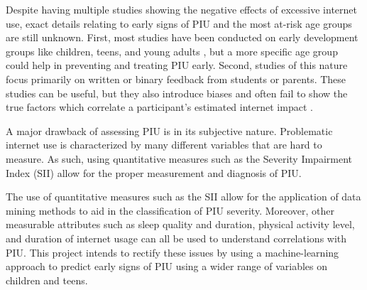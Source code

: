 \documentclass[11pt]{extarticle}
\begin{document}

Despite having multiple studies showing the negative effects of excessive internet use, exact details relating to early signs of PIU and the most at-risk age groups are still unknown.
First, most studies have been conducted on early development groups like children, teens, and young adults \cite{Pettorruso2020-qt,Cash2012-rb,Aboujaoude2010-mc,Restrepo2020-pb}, but a more specific age group could help in preventing and treating PIU early.
Second, studies of this nature focus primarily on written or binary feedback from students or parents. 
These studies can be useful, but they also introduce biases and often fail to show the true factors which correlate a participant's estimated internet impact \cite{Restrepo2020-pb,Aboujaoude2010-mc}.

A major drawback of assessing PIU is in its subjective nature. Problematic internet use is characterized by many different variables that are hard to measure. As such, using quantitative measures such as the Severity Impairment Index (SII) allow for the proper measurement and diagnosis of PIU.

The use of quantitative measures such as the SII allow for the application of data mining methods to aid in the classification of PIU severity. Moreover, other measurable attributes such as sleep quality and duration, physical activity level, and duration of internet usage can all be used to understand correlations with PIU.
This project intends to rectify these issues by using a machine-learning approach to predict early signs of PIU using a wider range of variables on children and teens.
\end{document}
